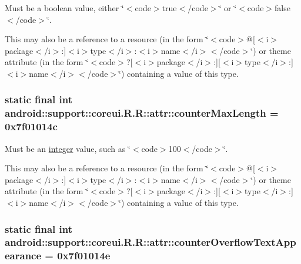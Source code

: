 Must be a boolean value, either \char`\"{}$<$code$>$true$<$/code$>$\char`\"{} or \char`\"{}$<$code$>$false$<$/code$>$\char`\"{}. 

This may also be a reference to a resource (in the form \char`\"{}$<$code$>$@\mbox{[}$<$i$>$package$<$/i$>$:\mbox{]}$<$i$>$type$<$/i$>$:$<$i$>$name$<$/i$>$$<$/code$>$\char`\"{}) or theme attribute (in the form \char`\"{}$<$code$>$?\mbox{[}$<$i$>$package$<$/i$>$:\mbox{]}\mbox{[}$<$i$>$type$<$/i$>$:\mbox{]}$<$i$>$name$<$/i$>$$<$/code$>$\char`\"{}) containing a value of this type. \hypertarget{classandroid_1_1support_1_1coreui_1_1_r_1_1attr_c09ff74f8b1a13264c3664ecd313ad60}{
\subsubsection[{counterMaxLength}]{\setlength{\rightskip}{0pt plus 5cm}static final int android::support::coreui.R.R::attr::counterMaxLength = 0x7f01014c}}
\label{classandroid_1_1support_1_1coreui_1_1_r_1_1attr_c09ff74f8b1a13264c3664ecd313ad60}


Must be an \hyperlink{classandroid_1_1support_1_1coreui_1_1_r_1_1integer}{integer} value, such as \char`\"{}$<$code$>$100$<$/code$>$\char`\"{}. 

This may also be a reference to a resource (in the form \char`\"{}$<$code$>$@\mbox{[}$<$i$>$package$<$/i$>$:\mbox{]}$<$i$>$type$<$/i$>$:$<$i$>$name$<$/i$>$$<$/code$>$\char`\"{}) or theme attribute (in the form \char`\"{}$<$code$>$?\mbox{[}$<$i$>$package$<$/i$>$:\mbox{]}\mbox{[}$<$i$>$type$<$/i$>$:\mbox{]}$<$i$>$name$<$/i$>$$<$/code$>$\char`\"{}) containing a value of this type. \hypertarget{classandroid_1_1support_1_1coreui_1_1_r_1_1attr_ae9520a1fc9ca33593e4935bc1100c12}{
\subsubsection[{counterOverflowTextAppearance}]{\setlength{\rightskip}{0pt plus 5cm}static final int android::support::coreui.R.R::attr::counterOverflowTextAppearance = 0x7f01014e}}
\label{classandroid_1_1support_1_1coreui_1_1_r_1_1attr_ae9520a1fc9ca33593e4935bc1100c12}


